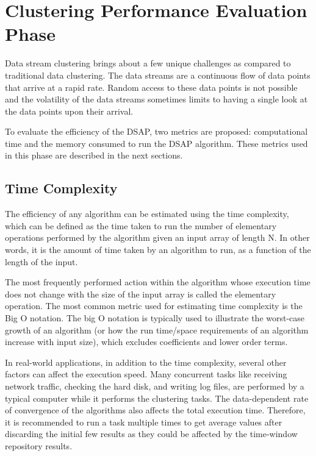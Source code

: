 \section{Clustering Performance Evaluation Phase}

Data stream clustering brings about a few unique challenges as compared to traditional data clustering. The data streams are a continuous flow of data points that arrive at a rapid rate. Random access to these data points is not possible and the volatility of the data streams sometimes limits to having a single look at the data points upon their arrival. 


To evaluate the efficiency of the DSAP, two metrics are proposed: computational time and the memory consumed to run the DSAP algorithm. These metrics used in this phase are described in the next sections.

\subsection{Time Complexity}

The efficiency of any algorithm can be estimated using the time complexity, which can be defined as the time taken to run the number of elementary operations performed by the algorithm given an input array of length N. In other words, it is the amount of time taken by an algorithm to run, as a function of the length of the input.  

The most frequently performed action within the algorithm whose execution time does not change with the size of the input array is called the elementary operation. The most common metric used for estimating time complexity is the Big O notation. The big O notation is typically used to illustrate the worst-case growth of an algorithm (or how the run time/space requirements of an algorithm increase with input size), which excludes coefficients and lower order terms.

In real-world applications, in addition to the time complexity, several other factors can affect the execution speed. Many concurrent tasks like receiving network traffic, checking the hard disk, and writing log files, are performed by a typical computer while it performs the clustering tasks. The data-dependent rate of convergence of the algorithms also affects the total execution time. Therefore, it is recommended to run a task multiple times to get average values after discarding the initial few results as they could be affected by the time-window repository results. %


